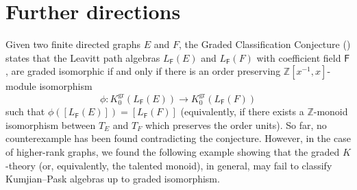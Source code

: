 \documentclass[12pt]{amsart}
\theoremstyle{definition}
\theoremstyle{remark}
\newcommand{\gr}{\operatorname{gr}}
\begin{document}
\section{Further directions}\label{sec future}
Given two finite directed graphs $E$ and $F$, the Graded Classification Conjecture (\cite{willie, mathann}) states that the Leavitt path algebras $L_\mathsf{F}(E)$ and $L_\mathsf{F}(F)$ with coefficient field $\mathsf{F}$, are graded isomorphic if and only if there is an order preserving $\mathbb{Z}[x^{-1},x]$-module isomorphism \[\phi:K_0^{\gr}(L_\mathsf{F}(E))\longrightarrow K_0^{\gr}(L_\mathsf{F}(F))\] such that $\phi([L_\mathsf{F}(E)])=[L_\mathsf{F}(F)]$ (equivalently, if there exists a $\mathbb{Z}$-monoid isomorphism between $T_E$ and $T_F$ which preserves the order units). So far, no counterexample has been found contradicting the conjecture. However, in the case of higher-rank graphs, we found the following example showing that the graded $K$-theory (or, equivalently, the talented monoid), in general, may fail to classify Kumjian--Pask algebras up to graded isomorphism.
\end{document}
